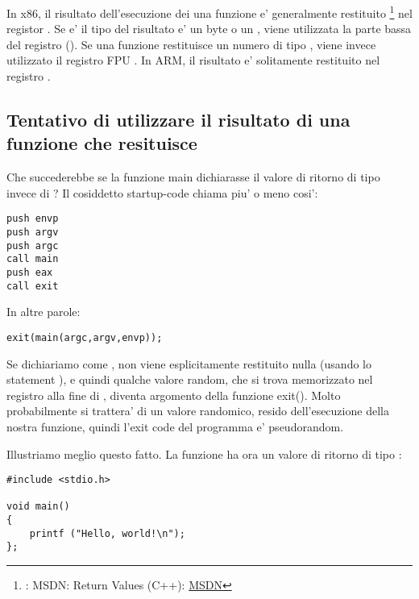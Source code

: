 

In x86, il risultato dell'esecuzione dei una funzione e' generalmente restituito
\footnote{\Seealso: MSDN: Return Values (C++): \href{http://go.yurichev.com/17258}{MSDN}}
nel registor \EAX. 
Se e' il tipo del risultato e' un byte o un \Tchar, viene utilizzata la parte bassa del registro \EAX (\AL). 
Se una funzione restituisce un numero di tipo \Tfloat, viene invece utilizzato il registro FPU .
In ARM, il risultato e' solitamente restituito nel registro .

\subsection{Tentativo di utilizzare il risultato di una funzione che resituisce \Tvoid}
\label{UseResultOfVoidFunc}

Che succederebbe se la funzione main dichiarasse il valore di ritorno di tipo \Tvoid invece di \Tint?
Il cosiddetto startup-code chiama \main piu' o meno cosi':

\begin{lstlisting}[style=customasmx86]
push envp
push argv
push argc
call main
push eax
call exit
\end{lstlisting}

In altre parole:

\begin{lstlisting}[style=customc]
exit(main(argc,argv,envp));
\end{lstlisting}

Se dichiariamo \main come \Tvoid, non viene esplicitamente restituito nulla  (usando lo statement ),
e quindi qualche valore random, che si trova memorizzato nel registro \EAX alla fine di \main, diventa argomento della funzione exit().
Molto probabilmente si trattera' di un valore randomico, resido dell'esecuzione della nostra funzione, quindi l'exit code del programma 
e' pseudorandom.
\par
Illustriamo meglio questo fatto. 
La funzione \main ha ora un valore di ritorno di tipo \Tvoid:

\begin{lstlisting}[style=customc]
#include <stdio.h>

void main()
{
	printf ("Hello, world!\n");
};
\end{lstlisting}

